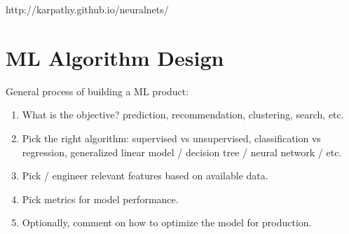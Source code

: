 http://karpathy.github.io/neuralnets/


\section{ML Algorithm Design}

General process of building a ML product:

\begin{enumerate}
\item What is the objective? prediction, recommendation, clustering, search, etc.
\item Pick the right algorithm: supervised vs unsupervised, classification vs regression, generalized linear model / decision tree / neural network / etc.
\item Pick / engineer relevant features based on available data.
\item Pick metrics for model performance.
\item Optionally, comment on how to optimize the model for production.
\end{enumerate}
